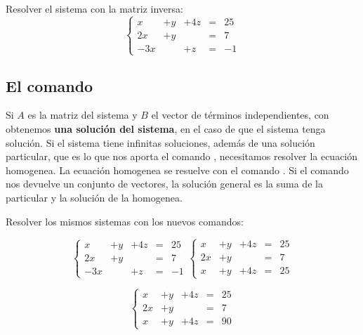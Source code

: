 \documentclass[a4paper,10pt, draft]{article}
\newcommand{\com}[1]{\textbf{\color{blue}{#1}}}
\newenvironment{ejer}{\begin{tcolorbox}[center title, title=Ejercicios,
fonttitle=\sffamily\bfseries,colback=blue!5,colframe=orange]}{\end{tcolorbox}}
\begin{document}
\begin{ejer}

Resolver el sistema con la matriz inversa:
$$
\left\{
\begin{array}{rlccc}
x&+y&+4z & =& 25\\
2x&+y&  &   =&  7 \\
-3x& &+z & =&  -1
\end{array}\right.
$$

\end{ejer} 


 \newpage

\subsection{El comando \com{LinearSolve[A,B]}}

Si $A$ es la matriz del sistema y $B$ el vector de términos independientes, con \com{LinearSolve[A,B]} obtenemos \textbf{una solución del sistema}, en el caso de que el sistema tenga solución. Si el sistema tiene infinitas soluciones, además de una solución particular, que es lo que nos aporta el comando \com{LinearSolve}, necesitamos resolver la ecuación homogenea. La ecuación homogenea se resuelve con el comando \com{NullSpace[m]}. Si el comando \com{NullSpace} nos devuelve un conjunto de vectores, la solución general es la suma de la particular y la solución de la homogenea.

\begin{ejer}

Resolver los mismos sistemas con los nuevos comandos:
\begin{small}
$$
\left\{
\begin{array}{rlccc}
x&+y&+4z & =& 25\\
2x&+y&  &   =&  7 \\
-3x& &+z & =&  -1
\end{array}\right.
 \left\{
\begin{array}{rlccc}
x&+y&+4z & =& 25\\
2x&+y&  &   =&  7 \\
x&+y&+4z & =& 25
\end{array}\right.
$$

$$
\left\{
\begin{array}{rlccc}
x&+y&+4z & =& 25\\
2x&+y&  &   =&  7 \\
x&+y&+4z & =& 90
\end{array}\right.
$$

\end{small}

\end{ejer} 
\end{document}
